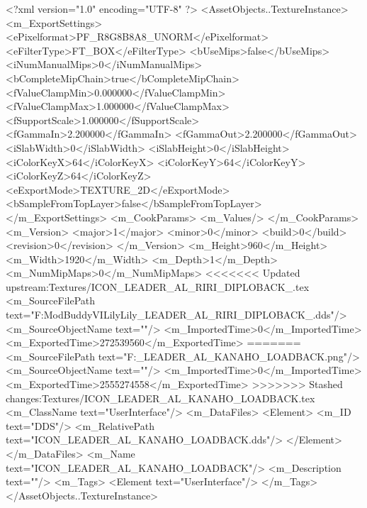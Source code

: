 <?xml version="1.0" encoding="UTF-8" ?>
<AssetObjects..TextureInstance>
	<m_ExportSettings>
		<ePixelformat>PF_R8G8B8A8_UNORM</ePixelformat>
		<eFilterType>FT_BOX</eFilterType>
		<bUseMips>false</bUseMips>
		<iNumManualMips>0</iNumManualMips>
		<bCompleteMipChain>true</bCompleteMipChain>
		<fValueClampMin>0.000000</fValueClampMin>
		<fValueClampMax>1.000000</fValueClampMax>
		<fSupportScale>1.000000</fSupportScale>
		<fGammaIn>2.200000</fGammaIn>
		<fGammaOut>2.200000</fGammaOut>
		<iSlabWidth>0</iSlabWidth>
		<iSlabHeight>0</iSlabHeight>
		<iColorKeyX>64</iColorKeyX>
		<iColorKeyY>64</iColorKeyY>
		<iColorKeyZ>64</iColorKeyZ>
		<eExportMode>TEXTURE_2D</eExportMode>
		<bSampleFromTopLayer>false</bSampleFromTopLayer>
	</m_ExportSettings>
	<m_CookParams>
		<m_Values/>
	</m_CookParams>
	<m_Version>
		<major>1</major>
		<minor>0</minor>
		<build>0</build>
		<revision>0</revision>
	</m_Version>
	<m_Height>960</m_Height>
	<m_Width>1920</m_Width>
	<m_Depth>1</m_Depth>
	<m_NumMipMaps>0</m_NumMipMaps>
<<<<<<< Updated upstream:Textures/ICON_LEADER_AL_RIRI_DIPLOBACK_.tex
	<m_SourceFilePath text="F:\1\Firaxis ModBuddy\Civilization VI\Assault Lily\Assault Lily\Textures\ICON_LEADER_AL_RIRI_DIPLOBACK_.dds"/>
	<m_SourceObjectName text=""/>
	<m_ImportedTime>0</m_ImportedTime>
	<m_ExportedTime>272539560</m_ExportedTime>
=======
	<m_SourceFilePath text="F:\DT\lilyimages\all\ICON_LEADER_AL_KANAHO_LOADBACK.png"/>
	<m_SourceObjectName text=""/>
	<m_ImportedTime>0</m_ImportedTime>
	<m_ExportedTime>2555274558</m_ExportedTime>
>>>>>>> Stashed changes:Textures/ICON_LEADER_AL_KANAHO_LOADBACK.tex
	<m_ClassName text="UserInterface"/>
	<m_DataFiles>
		<Element>
			<m_ID text="DDS"/>
			<m_RelativePath text="ICON_LEADER_AL_KANAHO_LOADBACK.dds"/>
		</Element>
	</m_DataFiles>
	<m_Name text="ICON_LEADER_AL_KANAHO_LOADBACK"/>
	<m_Description text=""/>
	<m_Tags>
		<Element text="UserInterface"/>
	</m_Tags>
</AssetObjects..TextureInstance>

